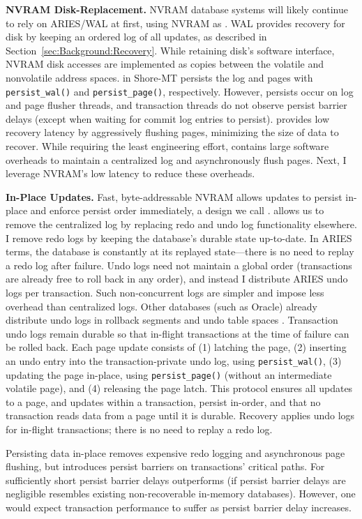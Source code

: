 \textbf{NVRAM Disk-Replacement.}
NVRAM database systems will likely continue to rely on ARIES/WAL at first, using NVRAM as \NVDisk.
WAL provides recovery for disk by keeping an ordered log of all updates, as described in Section~\ref{sec:Background:Recovery}.
While retaining disk's software interface, NVRAM disk accesses are implemented as copies between the volatile and nonvolatile address spaces.
\NVDisk in Shore-MT persists the log and pages with \texttt{persist\_wal()} and \texttt{persist\_page()}, respectively.
However, persists occur on log and page flusher threads, and transaction threads do not observe persist barrier delays (except when waiting for commit log entries to persist).
\NVDisk provides low recovery latency by aggressively flushing pages, minimizing the size of data to recover.
While requiring the least engineering effort, \NVDisk contains large software overheads to maintain a centralized log and asynchronously flush pages.
Next, I leverage NVRAM's low latency to reduce these overheads.

\textbf{In-Place Updates.}
Fast, byte-addressable NVRAM allows updates to persist in-place and enforce persist order immediately, a design we call \InPlace.
\InPlace allows us to remove the centralized log by replacing redo and undo log functionality elsewhere.
I remove redo logs by keeping the database's durable state up-to-date.
In ARIES terms, the database is constantly at its replayed state---there is no need to replay a redo log after failure.
Undo logs need not maintain a global order (transactions are already free to roll back in any order), and instead I distribute ARIES undo logs per transaction.
Such non-concurrent logs are simpler and impose less overhead than centralized logs.
Other databases (such as Oracle) already distribute undo logs in rollback segments and undo table spaces \cite{OracleDoc}.
Transaction undo logs remain durable so that in-flight transactions at the time of failure can be rolled back.
Each page update consists of (1) latching the page, (2) inserting an undo entry into the transaction-private undo log, using \texttt{persist\_wal()}, (3) updating the page in-place, using \texttt{persist\_page()} (without an intermediate volatile page), and (4) releasing the page latch.
This protocol ensures all updates to a page, and updates within a transaction, persist in-order, and that no transaction reads data from a page until it is durable.
Recovery applies undo logs for in-flight transactions; there is no need to replay a redo log.

Persisting data in-place removes expensive redo logging and asynchronous page flushing, but introduces persist barriers on transactions' critical paths.
For sufficiently short persist barrier delays \InPlace outperforms \NVDisk (if persist barrier delays are negligible \InPlace resembles existing non-recoverable in-memory databases).
However, one would expect transaction performance to suffer as persist barrier delay increases.

